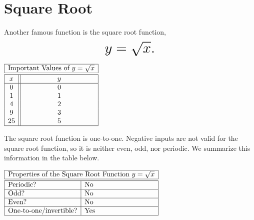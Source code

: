 \documentclass[nooutcomes]{ximera}
\begin{document}
\newpage


\section{Square Root}
Another famous function is the square root function, $$ \mbox{\huge $y=\sqrt{x}.$}$$ 

\begin{image}
\end{image}


\begin{center}
\(
\begin{array}{ |c || c|  }
 \hline
 \multicolumn{2}{|c|}{\text{\normalfont Important Values of } y=\sqrt{x}} \\
\hline
 \hline
 x & y\\
 \hline
 0&0\\
 1&1\\
 4&2\\
 9&3\\
 25&5\\
 \hline
\end{array}
\)
\end{center}

The square root function is one-to-one. Negative inputs are not valid for the square root function, so it is neither even, odd, nor periodic. We summarize this information in the table below.

\begin{center}
$
\begin{array}{|l|l|}
 \hline
 \multicolumn{2}{|c|}{\text{\normalfont Properties of the Square Root Function } y=\sqrt{x}} \\
\hline
 \hline
\text{Periodic?} & \text{No} \\ \hline
\text{Odd?} & \text{No} \\ \hline
\text{Even?} & \text{No} \\ \hline
\text{One-to-one/invertible?} & \text{Yes}\\ \hline
\end{array}
$
\end{center}
\end{document}
